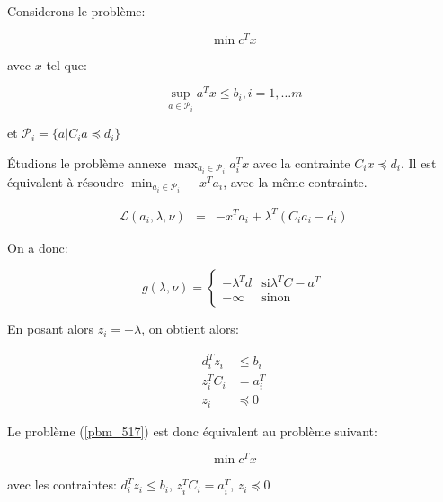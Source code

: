 \documentclass{article}
\begin{document}
Considerons le problème:

\begin{equation}
\label{pbm_517}
\min c^Tx
\end{equation}

avec $x$ tel que:

\begin{equation*}
\sup_{a \in \mathcal{P}_i} a^Tx \leq b_i, i = 1, \dots m
\end{equation*}

et $\mathcal{P}_i =  \{a | C_ia \preceq  d_i \}$

Étudions le problème annexe $\max_{a_i \in \mathcal{P}_i} a_i^T x$ avec la
contrainte $C_i x \preceq d_i$.
Il est équivalent à résoudre $\min_{a_i \in \mathcal{P}_i} - x^T a_i$, avec la
même contrainte.

\begin{align*}
\mathcal{L}(a_i, \lambda, \nu) & = & -x^T a_i + \lambda^T(C_i a_i - d_i)
\end{align*}

On a donc:

\begin{equation*}
g(\lambda, \nu) = \begin{cases}
		    - \lambda^T d & \mbox{si} \lambda^T C - a^T \\
		    - \infty & \mbox{sinon}
		  \end{cases}
\end{equation*}

En posant alors $z_i = - \lambda$, on obtient alors:

\begin{align*}
d_i^T z_i & \leq b_i \\
z_i^T C_i & = a_i^T \\
z_i & \preceq 0
\end{align*}

Le problème (\ref{pbm_517}) est donc équivalent au problème suivant:

\begin{equation*}
\min c^T x
\end{equation*}

avec les contraintes: $d_i^T z_i \leq b_i$, $z_i^T C_i = a_i^T$, $z_i \preceq 0$
\end{document}
